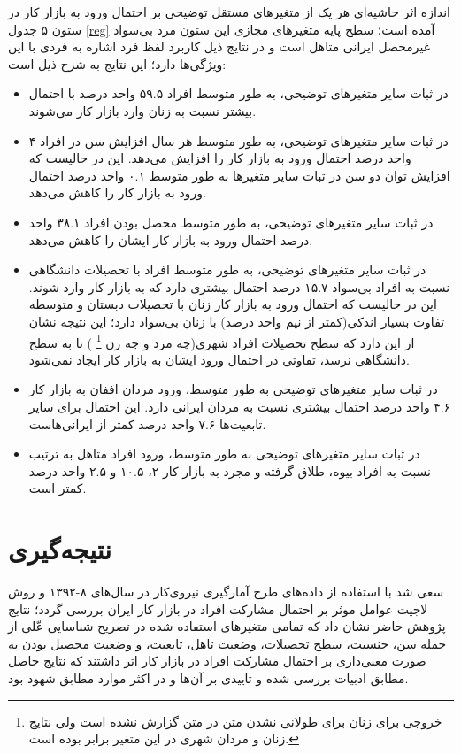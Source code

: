 \documentclass[12pt, a4paper]{article}
\begin{document}
اندازه اثر حاشیه‌ای
 هر یک از متغیرهای مستقل توضیحی بر احتمال ورود به بازار کار  در ستون ۵ جدول 
\ref{reg}
آمده است؛ سطح پایه متغیرهای مجازی این ستون مرد بی‌سواد غیرمحصل ایرانی متاهل است و در نتایج ذیل کاربرد لفظ فرد اشاره به فردی با این ویژگی‌ها دارد؛ این نتایج به شرح ذیل است:
\begin{itemize}
	\item
در ثبات سایر متغیرهای توضیحی، به طور متوسط افراد ۵۹.۵ واحد درصد با احتمال بیشتر نسبت به زنان وارد بازار کار می‌‌شوند.
	\item
در ثبات سایر متغیرهای توضیحی، به طور متوسط هر سال افزایش سن در افراد ۴ واحد درصد احتمال ورود به بازار کار را افزایش می‌دهد. این در حالیست که افزایش توان دو سن در ثبات سایر متغیرها به طور متوسط ۰.۱ واحد درصد احتمال ورود به بازار کار را کاهش می‌دهد.
	\item
در ثبات سایر متغیرهای توضیحی، به طور متوسط محصل بودن افراد ۳۸.۱ واحد درصد احتمال ورود به بازار کار ایشان را کاهش می‌دهد.
	\item
	در ثبات سایر متغیرهای توضیحی، به طور متوسط افراد با تحصیلات دانشگاهی نسبت به افراد بی‌سواد ۱۵.۷ درصد احتمال بیشتری دارد که به بازار کار وارد شوند. این در حالیست که احتمال ورود به بازار کار زنان با تحصیلات دبستان و متوسطه تفاوت بسیار اندکی(کمتر از نیم واحد درصد) با زنان بی‌سواد دارد؛ این نتیجه نشان از این دارد که سطح تحصیلات افراد شهری(چه مرد و چه زن
 \footnote{
 	خروجی
 	برای زنان برای طولانی نشدن متن در متن گزارش نشده است ولی نتایج زنان و مردان شهری در این متغیر برابر بوده است.
 	}
) تا به سطح دانشگاهی نرسد، تفاوتی در احتمال ورود ایشان به بازار کار ایجاد نمی‌شود.
	\item
در ثبات سایر متغیرهای توضیحی به طور متوسط، ورود مردان اففان به بازار کار ۴.۶ واحد درصد احتمال بیشتری نسبت به مردان ایرانی دارد. این احتمال برای سایر تابعیت‌ها ۷.۶ واحد درصد کمتر از ایرانی‌هاست.
	\item
	در ثبات سایر متغیرهای توضیحی به طور متوسط، ورود افراد متاهل به ترتیب نسبت به افراد بیوه، طلاق گرفته و مجرد به بازار کار ۲، ۱۰.۵ و ۲.۵ واحد درصد کمتر است.
\end{itemize}
\newpage \clearpage
\section{نتیجه‌گیری}
سعی شد  با استفاده از داده‌های طرح آمارگیری نیروی‌کار در سال‌های ۸-۱۳۹۲ و روش لاجیت عوامل موثر بر احتمال مشارکت افراد در بازار کار ایران بررسی گردد؛ نتایج پژوهش حاضر نشان داد که تمامی متغیرهای استفاده شده در تصریح شناسایی عّلی  از جمله سن،  جنسیت، سطح تحصیلات، وضعیت تاهل، تابعیت، و وضعیت محصیل بودن به صورت معنی‌داری بر احتمال مشارکت افراد در بازار کار اثر داشتند که نتایج حاصل مطابق ادبیات بررسی شده و تاییدی بر آن‌ها و در اکثر موارد مطابق شهود بود.
\end{document}
